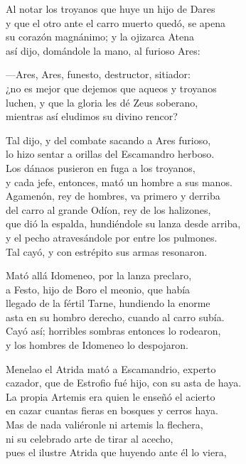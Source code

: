 Al notar los troyanos que huye un hijo de Dares\\
y que el otro ante el carro muerto quedó, se apena\\
su corazón magnánimo; y la ojizarca Atena\\
así dijo, domándole la mano, al furioso Ares:\par
---Ares, Ares, funesto, destructor, sitiador:\\
¿no es mejor que dejemos que aqueos y troyanos\\
luchen, y que la gloria les dé Zeus soberano,\\
mientras así eludimos su divino rencor?\par
Tal dijo, y del combate sacando a Ares furioso,\\
lo hizo sentar a orillas del Escamandro herboso.\\
Los dánaos pusieron en fuga a los troyanos,\\
y cada jefe, entonces, mató un hombre a sus manos.\\
Agamenón, rey de hombres, va primero y derriba\\
del carro al grande Odíon, rey de los halizones,\\
que dió la espalda, hundiéndole su lanza desde arriba,\\
y el pecho atravesándole por entre los pulmones.\\
Tal cayó, y con estrépito sus armas resonaron.\par
Mató allá Idomeneo, por la lanza preclaro,\\
a Festo, hijo de Boro el meonio, que había\\
llegado de la fértil Tarne, hundiendo la enorme\\
asta en su hombro derecho, cuando al carro subía.\\
Cayó así; horribles sombras entonces lo rodearon,\\
y los hombres de Idomeneo lo despojaron.\par
Menelao el Atrida mató a Escamandrio, experto\\
cazador, que de Estrofio fué hijo, con su asta de haya.\\
La propia Artemis era quien le enseñó el acierto\\
en cazar cuantas fieras en bosques y cerros haya.\\
Mas de nada valiéronle ni artemis la flechera,\\
ni su celebrado arte de tirar al acecho,\\
pues el ilustre Atrida que huyendo ante él lo viera,\\
